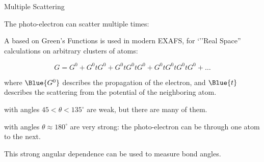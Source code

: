 
\begin{slide}{Multiple Scattering}
    \vmm
    
    The photo-electron can scatter multiple times:

    \vmm

    \begin{center}\end{center}
    
    
    A {} based on Green's Functions is used in modern
    EXAFS, for `''Real Space'' calculations on arbitrary clusters of atoms:
    
    \[ G = G^0 + G^0 t G^0 + G^0 t G^0 t G^0 + 
    G^0 t G^0 t G^0 t G^0 + \ldots \]
    
    where ${\Blue{G^0}}$ describes the propagation of the electron, and
    $\Blue{t}$ describes the scattering from the potential of the
    neighboring atom.

    \vmm
   
    
     with angles $ 45 < \theta <
    135^{\circ}$ are weak, but there are many of them.
    
     with angles $\theta \approx 180^{\circ}$ 
    are very strong: the photo-electron can be {} through
    one atom to the next.
    

    \vmm This strong angular dependence  can be used to measure bond angles.

    
        


    \vfill

\end{slide} 

